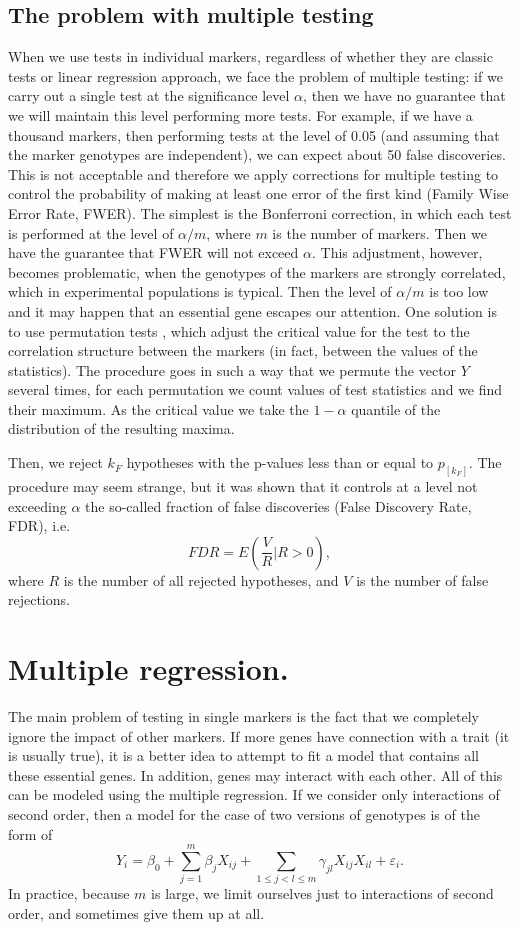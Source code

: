 \documentclass[]{MathAppl18}
\begin{document}
\subsection{The problem with multiple testing}
When we use tests in individual markers, regardless of whether they are classic tests or linear regression approach, we face the problem of multiple testing: if we carry out a single test at the significance level $\alpha$, then we have no guarantee that we will maintain this level performing more tests. For example, if we have a thousand markers, then performing tests at the level of 0.05 (and assuming that the marker genotypes are independent), we can expect about 50 false discoveries. This is not acceptable and therefore we apply corrections for multiple testing to control the probability of making at least one error of the first kind (Family Wise Error Rate, FWER). The simplest is the Bonferroni correction, in which each test is performed at the level of $\alpha/m$, where $m$ is the number of markers. Then we have the guarantee that FWER will not exceed $\alpha$. This adjustment, however, becomes problematic, when the genotypes of the markers are strongly correlated, which in experimental populations is typical. Then the level of $\alpha/m$ is too low and it may happen that an essential gene escapes our attention. One solution is to use permutation tests \cite{YosKunTak1998:Heart}, which adjust the critical value for the test to the correlation structure between the markers (in fact, between the values of the statistics). The procedure goes in such a way that we permute the vector $Y$ several times, for each permutation we count values of test statistics and we find their maximum. As the critical value we take the $1-\alpha$ quantile of the distribution of the resulting maxima.


Then, we reject $k_F$ hypotheses with the p-values less than or equal to $ p_{[k_F]}$. The procedure may seem strange, but it was shown that it controls at a level not exceeding $\alpha$ the so-called fraction of false discoveries (False Discovery Rate, FDR), i.e.
$$FDR=E\left(\frac{V}{R}|R>0\right),$$
where $ R $ is the number of all rejected hypotheses, and $V$ is the number of false rejections.


\section{Multiple regression.} The main problem of testing in single markers is the fact that we completely ignore the impact of other markers. If more genes have connection with a trait (it is usually true), it is a better idea to attempt to fit a model that contains all these essential genes. In addition, genes may interact with each other. All of this can be modeled using the multiple regression. If we consider only interactions of second order, then a model for the case of two versions of genotypes is of the form of
$$Y_i=\beta_0+\sum_{j=1}^m \beta_j X_{ij} + \sum_{1\leq j<l \leq m} \gamma_{jl} X_{ij}X_{il} + \varepsilon_i.$$
In practice, because $m$ is large, we limit ourselves just to interactions of second order, and sometimes give them up at all.
\end{document}
